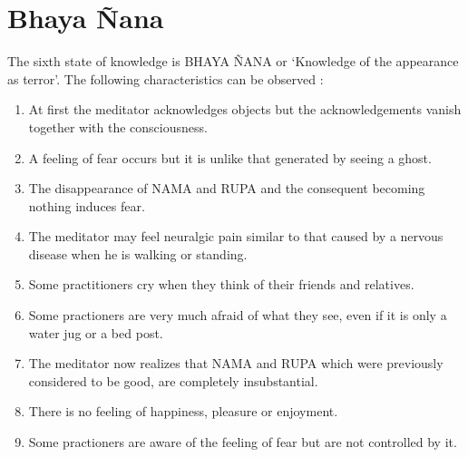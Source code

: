 \documentclass[a5paper,10pt,english]{book}
\begin{document}
\section{Bhaya Ñana}
\label{\detokenize{progress:bhaya-nana}}
\sphinxAtStartPar
The sixth state of knowledge is BHAYA ÑANA or ‘Knowledge of the appearance as terror’. The following characteristics can be observed :\sphinxhyphen{}
\begin{enumerate}
%
\item {} 
\sphinxAtStartPar
At first the meditator acknowledges objects but the acknowledgements vanish together with the consciousness.

\item {} 
\sphinxAtStartPar
A feeling of fear occurs but it is unlike that generated by seeing a ghost.

\item {} 
\sphinxAtStartPar
The disappearance of NAMA and RUPA and the consequent becoming nothing induces fear.

\item {} 
\sphinxAtStartPar
The meditator may feel neuralgic pain similar to that caused by a nervous disease when he is walking or standing.

\item {} 
\sphinxAtStartPar
Some practitioners cry when they think of their friends and relatives.

\item {} 
\sphinxAtStartPar
Some practioners are very much afraid of what they see, even if it is only a water jug or a bed post.

\item {} 
\sphinxAtStartPar
The meditator now realizes that NAMA and RUPA which were previously considered to be good, are completely insubstantial.

\item {} 
\sphinxAtStartPar
There is no feeling of happiness, pleasure or enjoyment.

\item {} 
\sphinxAtStartPar
Some practioners are aware of the feeling of fear but are not controlled by it.

\end{enumerate}
\end{document}
